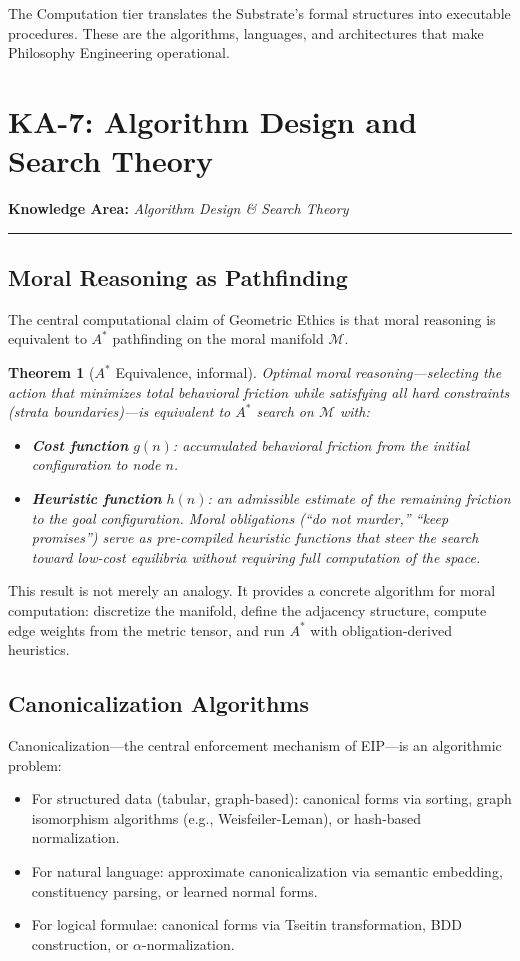 \documentclass[12pt,letterpaper]{article}
\newtheorem{theorem}{Theorem}[section]
\theoremstyle{definition}
\theoremstyle{plain}
\newcommand{\calM}{\mathcal{M}}
\newcommand{\ka}[1]{\vspace{1em}\noindent\textbf{\large Knowledge Area:} \textit{#1}\vspace{0.5em}\hrule\vspace{0.5em}}
\begin{document}
The Computation tier translates the Substrate's formal structures into executable procedures. These are the algorithms, languages, and architectures that make Philosophy Engineering operational.

\section{KA-7: Algorithm Design and Search Theory}
\label{sec:ka7}

\ka{Algorithm Design \& Search Theory}

\subsection{Moral Reasoning as Pathfinding}

The central computational claim of Geometric Ethics is that moral reasoning is equivalent to $A^*$ pathfinding on the moral manifold $\calM$.

\begin{theorem}[$A^*$ Equivalence, informal]
Optimal moral reasoning---selecting the action that minimizes total behavioral friction while satisfying all hard constraints (strata boundaries)---is equivalent to $A^*$ search on $\calM$ with:
\begin{itemize}
    \item \textbf{Cost function} $g(n)$: accumulated behavioral friction from the initial configuration to node $n$.
    \item \textbf{Heuristic function} $h(n)$: an admissible estimate of the remaining friction to the goal configuration. Moral obligations (``do not murder,'' ``keep promises'') serve as pre-compiled heuristic functions that steer the search toward low-cost equilibria without requiring full computation of the space.
\end{itemize}
\end{theorem}

This result is not merely an analogy. It provides a concrete algorithm for moral computation: discretize the manifold, define the adjacency structure, compute edge weights from the metric tensor, and run $A^*$ with obligation-derived heuristics.

\subsection{Canonicalization Algorithms}

Canonicalization---the central enforcement mechanism of EIP---is an algorithmic problem:
\begin{itemize}
    \item For structured data (tabular, graph-based): canonical forms via sorting, graph isomorphism algorithms (e.g., Weisfeiler-Leman), or hash-based normalization.
    \item For natural language: approximate canonicalization via semantic embedding, constituency parsing, or learned normal forms.
    \item For logical formulae: canonical forms via Tseitin transformation, BDD construction, or $\alpha$-normalization.
\end{itemize}
\end{document}
